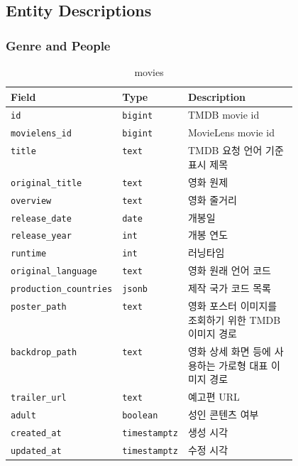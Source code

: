 \documentclass[11pt,a4paper]{article}
\renewcommand{\arraystretch}{1.18}
\begin{document}
\hypertarget{entity-descriptions}{%
\subsection{Entity Descriptions}\label{entity-descriptions}}

\hypertarget{genre-and-people-1}{%
\subsubsection{Genre and People}\label{genre-and-people-1}}

\begin{table}[H]
\centering
\footnotesize
\setlength{\tabcolsep}{5pt}
\renewcommand{\arraystretch}{1.28}
\begin{tabularx}{\linewidth}{@{}>{\RaggedRight\arraybackslash}p{0.25\linewidth}>{\RaggedRight\arraybackslash}p{0.22\linewidth}>{\RaggedRight\arraybackslash}X@{}}
\toprule
\textbf{Field} & \textbf{Type} & \textbf{Description} \\
\midrule
\texttt{id} & \texttt{bigint} & TMDB movie id \\
\texttt{movielens\_\allowbreak{}id} & \texttt{bigint} & MovieLens movie id \\
\texttt{title} & \texttt{text} & TMDB 요청 언어 기준 표시 제목 \\
\texttt{original\_\allowbreak{}title} & \texttt{text} & 영화 원제 \\
\texttt{overview} & \texttt{text} & 영화 줄거리 \\
\texttt{release\_\allowbreak{}date} & \texttt{date} & 개봉일 \\
\texttt{release\_\allowbreak{}year} & \texttt{int} & 개봉 연도 \\
\texttt{runtime} & \texttt{int} & 러닝타임 \\
\texttt{original\_\allowbreak{}language} & \texttt{text} & 영화 원래 언어 코드 \\
\texttt{production\_\allowbreak{}countries} & \texttt{jsonb} & 제작 국가 코드 목록 \\
\texttt{poster\_\allowbreak{}path} & \texttt{text} & 영화 포스터 이미지를 조회하기 위한 TMDB 이미지 경로 \\
\texttt{backdrop\_\allowbreak{}path} & \texttt{text} & 영화 상세 화면 등에 사용하는 가로형 대표 이미지 경로 \\
\texttt{trailer\_\allowbreak{}url} & \texttt{text} & 예고편 URL \\
\texttt{adult} & \texttt{boolean} & 성인 콘텐츠 여부 \\
\texttt{created\_\allowbreak{}at} & \texttt{timestamptz} & 생성 시각 \\
\texttt{updated\_\allowbreak{}at} & \texttt{timestamptz} & 수정 시각 \\
\bottomrule
\end{tabularx}
\caption{movies}
\end{table}
\end{document}
